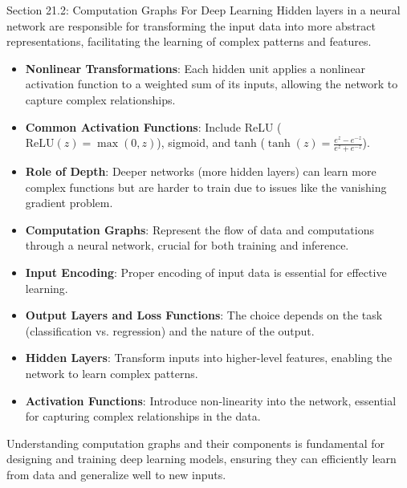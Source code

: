 \begin{notes}{Section 21.2: Computation Graphs For Deep Learning}
    Hidden layers in a neural network are responsible for transforming the input data into more abstract representations, facilitating the learning of complex patterns and features.
    
    \begin{highlight}
    
        \begin{itemize}
            \item \textbf{Nonlinear Transformations}: Each hidden unit applies a nonlinear activation function to a weighted sum of its inputs, allowing the network to capture complex relationships.
            \item \textbf{Common Activation Functions}: Include ReLU ($\text{ReLU}(z) = \max(0, z)$), sigmoid, and tanh ($\tanh(z) = \frac{e^{z} - e^{-z}}{e^{z} + e^{-z}}$).
            \item \textbf{Role of Depth}: Deeper networks (more hidden layers) can learn more complex functions but are harder to train due to issues like the vanishing gradient problem.
        \end{itemize}
    
    \end{highlight}
    
    \begin{highlight}
    
        \begin{itemize}
            \item \textbf{Computation Graphs}: Represent the flow of data and computations through a neural network, crucial for both training and inference.
            \item \textbf{Input Encoding}: Proper encoding of input data is essential for effective learning.
            \item \textbf{Output Layers and Loss Functions}: The choice depends on the task (classification vs. regression) and the nature of the output.
            \item \textbf{Hidden Layers}: Transform inputs into higher-level features, enabling the network to learn complex patterns.
            \item \textbf{Activation Functions}: Introduce non-linearity into the network, essential for capturing complex relationships in the data.
        \end{itemize}
    
        Understanding computation graphs and their components is fundamental for designing and training deep learning models, ensuring they can efficiently learn from data and generalize well to new inputs.
    
    \end{highlight}
\end{notes}

